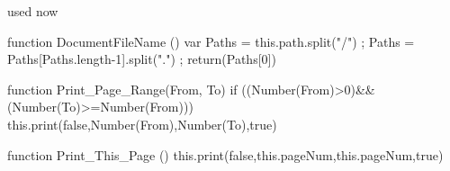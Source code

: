 
 used now 

  function DocumentFileName ()
    { var Paths = this.path.split("/") ;
      Paths = Paths[Paths.length-1].split(".") ;
      return(Paths[0]) }

  function Print_Page_Range(From, To) %
    { if ((Number(From)>0)&&(Number(To)>=Number(From))) 
        { this.print(false,Number(From),Number(To),true) } }

  function Print_This_Page () 
    { this.print(false,this.pageNum,this.pageNum,true) } 

\stopJSpreamble





\endinput
